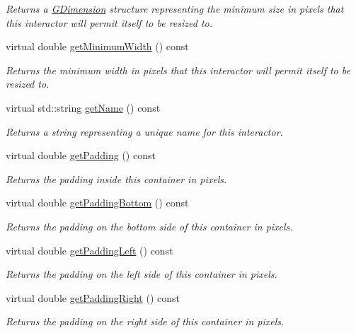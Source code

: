 \begin{DoxyCompactItemize}
\begin{DoxyCompactList}\small\item\em Returns a \mbox{\hyperlink{structGDimension}{G\+Dimension}} structure representing the minimum size in pixels that this interactor will permit itself to be resized to. \end{DoxyCompactList}\item 
virtual double \mbox{\hyperlink{classGInteractor_a59e668114fe3d49d2a0f28deb258f7c8}{get\+Minimum\+Width}} () const
\begin{DoxyCompactList}\small\item\em Returns the minimum width in pixels that this interactor will permit itself to be resized to. \end{DoxyCompactList}\item 
virtual std\+::string \mbox{\hyperlink{classGInteractor_a8a60438a5b55d0b2ceb35c8674b9d8c5}{get\+Name}} () const
\begin{DoxyCompactList}\small\item\em Returns a string representing a unique name for this interactor. \end{DoxyCompactList}\item 
virtual double \mbox{\hyperlink{classGContainer_a19fdf4f4500aead343992102066983cb}{get\+Padding}} () const
\begin{DoxyCompactList}\small\item\em Returns the padding inside this container in pixels. \end{DoxyCompactList}\item 
virtual double \mbox{\hyperlink{classGContainer_a5696e2debbbafb717c0d47e069b896e4}{get\+Padding\+Bottom}} () const
\begin{DoxyCompactList}\small\item\em Returns the padding on the bottom side of this container in pixels. \end{DoxyCompactList}\item 
virtual double \mbox{\hyperlink{classGContainer_af28748a6467a4d3337788578522fa8f4}{get\+Padding\+Left}} () const
\begin{DoxyCompactList}\small\item\em Returns the padding on the left side of this container in pixels. \end{DoxyCompactList}\item 
virtual double \mbox{\hyperlink{classGContainer_a8d75cea586f7cd6611432122a080ecce}{get\+Padding\+Right}} () const
\begin{DoxyCompactList}\small\item\em Returns the padding on the right side of this container in pixels. \end{DoxyCompactList}\item 

\end{DoxyCompactItemize}
